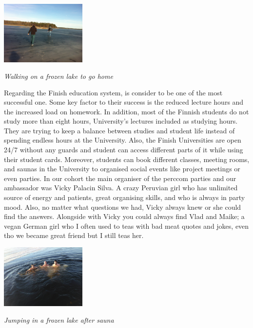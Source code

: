 \documentclass[10pt,a4paper]{article} %
\begin{document}
\begin{multicols}{3}
\begin{center}
	\includegraphics[width=0.32\textwidth]{media/walking_on_ice.jpg}
	\par\textit{Walking on a frozen lake to go home}
\end{center}


Regarding the Finish education system, is consider to be one of the most successful 
one. 
Some key factor to their success is the reduced lecture hours and the increased 
load on homework. 
In addition, most of the Finnish students do not study more than eight hours, 
University's lectures included as studying hours. 
They are trying to keep a balance between studies and student life instead of 
spending endless hours at the University. 
Also, the Finish Universities are open 24/7 without any guards and student can 
access different parts of it while using their student cards. 
Moreover, students can book different classes, meeting rooms, and saunas 
in the University to organised social events like project meetings or even parties. 
In our cohort the main organiser of the {\sc perccom} parties and our ambassador was 
Vicky Palacin Silva. 
A crazy Peruvian girl who has unlimited source of energy and patients, great 
organising skills, and who is always in party mood. 
Also, no matter what questions we had, Vicky always knew or she could 
find the answers. 
Alongside with Vicky you could always find Vlad and Maike; a vegan German girl 
who I often used to teas with bad meat quotes and jokes, even tho we became 
great friend but I still teas her.


\begin{center}
	\includegraphics[width=0.32\textwidth]{media/after_sauna_lake.jpg}
	\par\textit{Jumping in a frozen lake after sauna}
\end{center}



\end{multicols}
\end{document}
